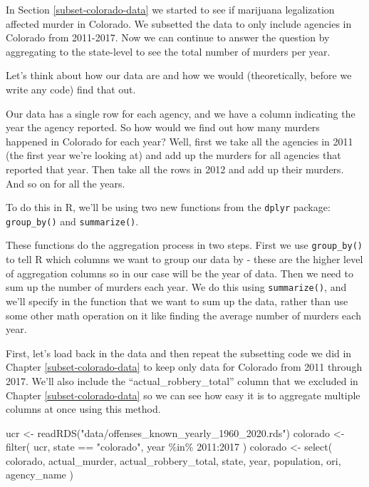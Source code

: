 \documentclass[
  a4paper,
]{krantz}
\makeatletter
\newenvironment{Shaded}{\begin{snugshade}}{\end{snugshade}}
\newcommand{\DecValTok}[1]{\textcolor[rgb]{0.06,0.06,0.06}{#1}}
\newcommand{\FunctionTok}[1]{\textcolor[rgb]{0,0,0}{#1}}
\newcommand{\NormalTok}[1]{#1}
\newcommand{\OtherTok}[1]{\textcolor[rgb]{0.37,0.37,0.37}{#1}}
\newcommand{\SpecialCharTok}[1]{\textcolor[rgb]{0,0,0}{#1}}
\newcommand{\StringTok}[1]{\textcolor[rgb]{0.5,0.5,0.5}{#1}}
\newenvironment{kframe}{%
\medskip{}
\setlength{\fboxsep}{.8em}
 \def\at@end@of@kframe{}%
 \ifinner\ifhmode%
  \def\at@end@of@kframe{\end{minipage}}%
  \begin{minipage}{\columnwidth}%
 \fi\fi%
 \def\FrameCommand##1{\hskip\@totalleftmargin \hskip-\fboxsep
 \colorbox{shadecolor}{##1}\hskip-\fboxsep
     \hskip-\linewidth \hskip-\@totalleftmargin \hskip\columnwidth}%
 \MakeFramed {\advance\hsize-\width
   \@totalleftmargin\z@ \linewidth\hsize
   \@setminipage}}%
 {\par\unskip\endMakeFramed%
 \at@end@of@kframe}
\renewenvironment{Shaded}{\begin{kframe}}{\end{kframe}}
\makeatother
\begin{document}
In Section \ref{subset-colorado-data} we started to see if
marijuana legalization affected murder in Colorado. We
subsetted the data to only include agencies in Colorado from
2011-2017. Now we can continue to answer the question by
aggregating to the state-level to see the total number of
murders per year.

Let's think about how our data are and how we would
(theoretically, before we write any code) find that out.

Our data has a single row for each agency, and we have a
column indicating the year the agency reported. So how would
we find out how many murders happened in Colorado for each
year? Well, first we take all the agencies in 2011 (the
first year we're looking at) and add up the murders for all
agencies that reported that year. Then take all the rows in
2012 and add up their murders. And so on for all the years.

To do this in R, we'll be using two new functions from the
\texttt{dplyr} package: \texttt{group\_by()} and
\texttt{summarize()}.

These functions do the aggregation process in two steps.
First we use \texttt{group\_by()} to tell R which columns we
want to group our data by - these are the higher level of
aggregation columns so in our case will be the year of data.
Then we need to sum up the number of murders each year. We
do this using \texttt{summarize()}, and we'll specify in the
function that we want to sum up the data, rather than use
some other math operation on it like finding the average
number of murders each year.

First, let's load back in the data and then repeat the
subsetting code we did in Chapter \ref{subset-colorado-data}
to keep only data for Colorado from 2011 through 2017. We'll
also include the ``actual\_robbery\_total'' column that we
excluded in Chapter \ref{subset-colorado-data} so we can see
how easy it is to aggregate multiple columns at once using
this method.

\begin{Shaded}
\begin{Highlighting}[]
\NormalTok{ucr }\OtherTok{\textless{}{-}} \FunctionTok{readRDS}\NormalTok{(}\StringTok{"data/offenses\_known\_yearly\_1960\_2020.rds"}\NormalTok{)}
\NormalTok{colorado }\OtherTok{\textless{}{-}} \FunctionTok{filter}\NormalTok{(}
\NormalTok{  ucr, state }\SpecialCharTok{==} \StringTok{"colorado"}\NormalTok{,}
\NormalTok{  year }\SpecialCharTok{\%in\%} \DecValTok{2011}\SpecialCharTok{:}\DecValTok{2017}
\NormalTok{)}
\NormalTok{colorado }\OtherTok{\textless{}{-}} \FunctionTok{select}\NormalTok{(}
\NormalTok{  colorado, actual\_murder, actual\_robbery\_total,}
\NormalTok{  state, year, population, ori, agency\_name}
\NormalTok{)}
\end{Highlighting}
\end{Shaded}
\end{document}
